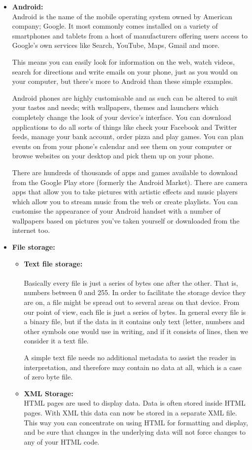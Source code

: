 \documentclass[10pt,a4paper]{article}
\begin{document}
\begin{itemize}
\item \textbf{Android:}\\
Android is the name of the mobile operating system owned by American company; Google. It most commonly comes installed on a variety of smartphones and tablets from a host of manufacturers offering users access to Google's own services like Search, YouTube, Maps, Gmail and more.

This means you can easily look for information on the web, watch videos, search for directions and write emails on your phone, just as you would on your computer, but there's more to Android than these simple examples.

Android phones are highly customisable and as such can be altered to suit your tastes and needs; with wallpapers, themes and launchers which completely change the look of your device's interface. You can download applications to do all sorts of things like check your Facebook and Twitter feeds, manage your bank account, order pizza and play games. You can plan events on from your phone's calendar and see them on your computer or browse websites on your desktop and pick them up on your phone.

There are hundreds of thousands of apps and games available to download from the Google Play store (formerly the Android Market). There are camera apps that allow you to take pictures with artistic effects and music players which allow you to stream music from the web or create playlists. You can customise the appearance of your Android handset with a number of wallpapers based on pictures you've taken yourself or downloaded from the internet too.
\item \textbf{File storage:}
	\begin{itemize}
   \item \textbf{Text file storage:}\\\\
Basically every file is just a series of bytes one after the other. That is, numbers between 0 and 255. In order to facilitate the storage device they are on, a file might be spread out to several areas on that device. From our point of view, each file is just a series of bytes. In general every file is a binary file, but if the data in it contains only text (letter, numbers and other symbols one would use in writing, and if it consists of lines, then we consider it a text file.

A simple text file needs no additional metadata to assist the reader in interpretation, and therefore may contain no data at all, which is a case of zero byte file.\\
	\item \textbf{XML Storage:}\\
HTML pages are used to display data. Data is often stored inside HTML pages. With XML this data can now be stored in a separate XML file. This way you can concentrate on using HTML for formatting and display, and be sure that changes in the underlying data will not force changes to any of your HTML code.


\end{itemize}
\end{itemize}
\end{document}
